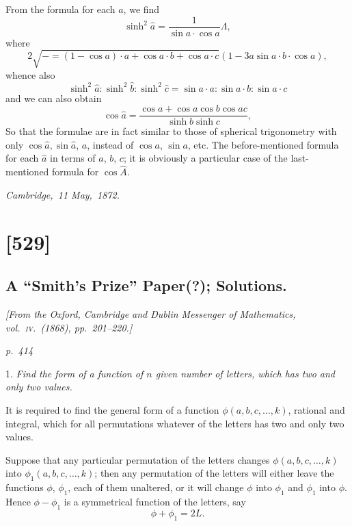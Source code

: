 \documentclass[11pt,a4paper]{article}
\theoremstyle{plain}
\theoremstyle{definition}
\begin{document}
From the formula for each $a$, we find
\[
\sinh^2 \hat{a} = \frac{1}{\sin a \cdot \cos a} \Lambda,
\]
where
\[
2\sqrt{- = (1 - \cos a) \cdot a + \cos a \cdot b + \cos a \cdot c}(1 - 3 a \sin a \cdot b \cdot \cos a),
\]
whence also
\[
\sinh^2 \hat{a} : \sinh^2 \hat{b} : \sinh^2 \hat{c} = \sin a \cdot a : \sin a \cdot b : \sin a \cdot c
\]
and we can also obtain
\[
\cos \hat{a} = \frac{\cos a + \cos a \cos b \cos a c}{\sinh b \sinh c},
\]
So that the formulae are in fact similar to those of spherical trigonometry with only
$\cos \hat{a}, \sin \hat{a}$, $a$, instead of $\cos a$, $\sin a$, etc.  The before-mentioned formula for each $\hat{a}$ in
terms of $a$, $b$, $c$; it is obviously a particular case of the last-mentioned formula for $\cos \hat{A}$.

\noindent\textit{Cambridge,\ 11 May,\ 1872.}

\clearpage

\section{[529]}
\subsection{A ``Smith's Prize'' Paper(?); Solutions.}

\begin{center}
\textit{[From the Oxford, Cambridge and Dublin Messenger of Mathematics, vol.~\textsc{iv}.\ (1868), pp.\ 201--220.]}
\end{center}

\textit{p.~414}

\noindent
\textsc{1.}  \textit{Find the form of a function of $n$ given number of letters, which has two and only two values.}

It is required to find the general form of a function $\phi(a, b, c, \ldots, k)$, rational and
integral, which for all permutations whatever of the letters has two and only two values.

Suppose that any particular permutation of the letters changes $\phi(a, b, c, \ldots, k)$ into
$\phi_1(a, b, c, \ldots, k)$; then any permutation of the letters will either leave the functions
$\phi$, $\phi_1$, each of them unaltered, or it will change $\phi$ into $\phi_1$ and $\phi_1$ into $\phi$. Hence
$\phi - \phi_1$ is a symmetrical function of the letters, say
\[
\phi + \phi_1 = 2L.
\]
\end{document}
